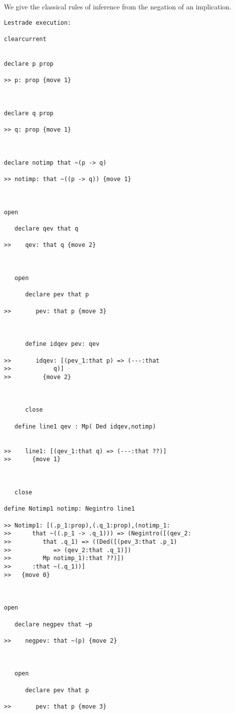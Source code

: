 \documentclass[12pt]{article}
\begin{document}
We give the classical rules of inference from the negation of an implication.

\begin{verbatim}Lestrade execution:

clearcurrent


declare p prop

>> p: prop {move 1}



declare q prop

>> q: prop {move 1}



declare notimp that ~(p -> q)

>> notimp: that ~((p -> q)) {move 1}



open

   declare qev that q

>>    qev: that q {move 2}



   open

      declare pev that p

>>       pev: that p {move 3}



      define idqev pev: qev

>>       idqev: [(pev_1:that p) => (---:that
>>            q)]
>>         {move 2}



      close

   define line1 qev : Mp( Ded idqev,notimp)


>>    line1: [(qev_1:that q) => (---:that ??)]
>>      {move 1}



   close

define Notimp1 notimp: Negintro line1

>> Notimp1: [(.p_1:prop),(.q_1:prop),(notimp_1:
>>      that ~((.p_1 -> .q_1))) => (Negintro([(qev_2:
>>         that .q_1) => ((Ded([(pev_3:that .p_1)
>>            => (qev_2:that .q_1)])
>>         Mp notimp_1):that ??)])
>>      :that ~(.q_1))]
>>   {move 0}



open

   declare negpev that ~p

>>    negpev: that ~(p) {move 2}



   open

      declare pev that p

>>       pev: that p {move 3}




\end{verbatim}
\end{document}
